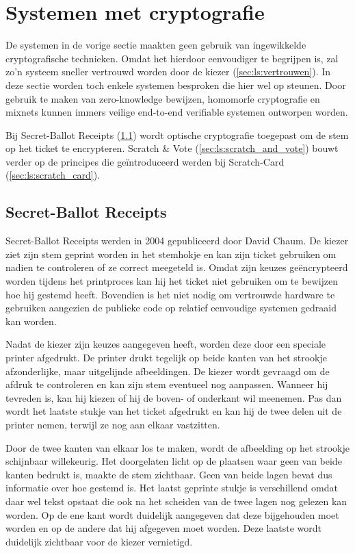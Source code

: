 \section{Systemen met cryptografie}
\label{sec:ls:systemen_met_cryptografie}

De systemen in de vorige sectie maakten geen gebruik van ingewikkelde cryptografische technieken. Omdat het hierdoor eenvoudiger te begrijpen is, zal zo'n systeem sneller vertrouwd worden door de kiezer (\ref{sec:ls:vertrouwen}). In deze sectie worden toch enkele systemen besproken die hier wel op steunen. Door gebruik te maken van zero-knowledge bewijzen, homomorfe cryptografie en mixnets kunnen immers veilige end-to-end verifiable systemen ontworpen worden.

\npar Bij Secret-Ballot Receipts (\ref{sec:ls:secret_ballot_receipts}) wordt optische cryptografie toegepast om de stem op het ticket te encrypteren. Scratch \& Vote (\ref{sec:ls:scratch_and_vote}) bouwt verder op de principes die geïntroduceerd werden bij Scratch-Card (\ref{sec:ls:scratch_card}).

\subsection{Secret-Ballot Receipts~\cite{chaum_secret_ballot}}
\label{sec:ls:secret_ballot_receipts}

Secret-Ballot Receipts werden in 2004 gepubliceerd door David Chaum. De kiezer ziet zijn stem geprint worden in het stemhokje en kan zijn ticket gebruiken om nadien te controleren of ze correct meegeteld is. Omdat zijn keuzes ge\"encrypteerd worden tijdens het printproces kan hij het ticket niet gebruiken om te bewijzen hoe hij gestemd heeft. Bovendien is het niet nodig om vertrouwde hardware te gebruiken aangezien de publieke code op relatief eenvoudige systemen gedraaid kan worden.

\npar Nadat de kiezer zijn keuzes aangegeven heeft, worden deze door een speciale printer afgedrukt. De printer drukt tegelijk op beide kanten van het strookje afzonderlijke, maar uitgelijnde afbeeldingen. De kiezer wordt gevraagd om de afdruk te controleren en kan zijn stem eventueel nog aanpassen. Wanneer hij tevreden is, kan hij kiezen of hij de boven- of onderkant wil meenemen. Pas dan wordt het laatste stukje van het ticket afgedrukt en kan hij de twee delen uit de printer nemen, terwijl ze nog aan elkaar vastzitten.

\npar Door de twee kanten van elkaar los te maken, wordt de afbeelding op het strookje schijnbaar willekeurig. Het doorgelaten licht op de plaatsen waar geen van beide kanten bedrukt is, maakte de stem zichtbaar. Geen van beide lagen bevat dus informatie over hoe gestemd is. Het laatst geprinte stukje is verschillend omdat daar wel tekst opstaat die ook na het scheiden van de twee lagen nog gelezen kan worden. Op de ene kant wordt duidelijk aangegeven dat deze bijgehouden moet worden en op de andere dat hij afgegeven moet worden. Deze laatste wordt duidelijk zichtbaar voor de kiezer vernietigd.


